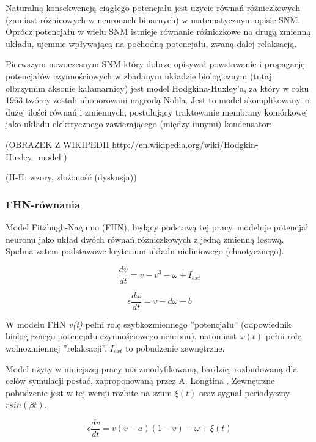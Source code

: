 \documentclass[12pt]{article}
\begin{document}
  Naturalną konsekwencją ciągłego potencjału jest użycie równań różniczkowych (zamiast różnicowych w neuronach binarnych) w matematycznym opisie SNM. Oprócz potencjału w wielu SNM istnieje równanie różniczkowe na drugą zmienną układu, ujemnie wpływającą na pochodną potencjału, zwaną dalej relaksacją.
  
  Pierwszym nowoczesnym SNM który dobrze opisywał powstawanie i propagację potencjałów czynnościowych w zbadanym układzie biologicznym (tutaj: olbrzymim aksonie kałamarnicy) jest model Hodgkina-Huxley'a, za który w roku 1963 twórcy zostali uhonorowani nagrodą Nobla. Jest to model skomplikowany, o dużej ilości równań i zmiennych, postulujący traktowanie membrany komórkowej jako układu elektrycznego zawierającego (między innymi) kondensator:
  
  (OBRAZEK Z WIKIPEDII \url{http://en.wikipedia.org/wiki/Hodgkin-Huxley_model} )

  (H-H: wzory, złożoność (dyskusja))

  \subsubsection{FHN-równania}

  Model Fitzhugh-Nagumo (FHN), będący podstawą tej pracy, modeluje potencjał neuronu jako układ dwóch równań różniczkowych z jedną zmienną losową. Spełnia zatem podstawowe kryterium układu nieliniowego (chaotycznego).

  \begin{equation}
    \frac{dv}{dt} = v - v^3 - \omega + I_{ext}
  \end{equation}

  \begin{equation}
    \epsilon \frac{d \omega}{dt} = v - d \omega - b
  \end{equation}

  W modelu FHN \emph{v(t)} pełni rolę szybkozmiennego ''potencjału'' (odpowiednik biologicznego potencjału czynnościowego neuronu), natomiast $\omega (t)$ pełni rolę wolnozmiennej ''relaksacji''. $I_{ext}$ to pobudzenie zewnętrzne.


  Model użyty w niniejszej pracy ma zmodyfikowaną, bardziej rozbudowaną dla celów symulacji postać, zaproponowaną przez A. Longtina \cite{longtin}. Zewnętrzne pobudzenie jest w tej wersji rozbite na szum $\xi(t)$ oraz sygnał periodyczny $r sin(\beta t)$.

  \begin{equation} \label{eq:v}
    \epsilon \frac{dv}{dt} = v(v-a)(1-v)- \omega + \xi(t)
  \end{equation}
\end{document}
